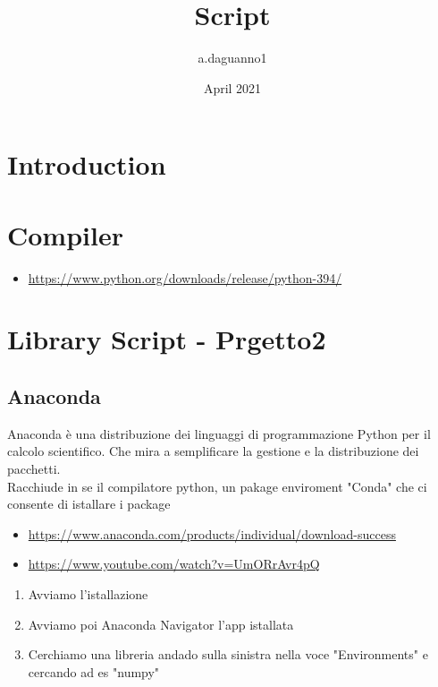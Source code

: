 \documentclass{article}
\title{Script}
\author{a.daguanno1 }
\date{April 2021}
\begin{document}
\maketitle

\section{Introduction}
\section{Compiler}
\begin{itemize}
    \item\url{https://www.python.org/downloads/release/python-394/}
\end{itemize}
\section{Library Script - \textbf{Prgetto2}}
\subsection{Anaconda}
Anaconda è una distribuzione dei linguaggi di programmazione Python per il calcolo scientifico. Che mira a semplificare la gestione e la distribuzione dei pacchetti.
\\Racchiude in se il compilatore python, un pakage enviroment "Conda" che ci consente di istallare i package 
\begin{itemize}
    \item\url{https://www.anaconda.com/products/individual/download-success}
    \item\url{https://www.youtube.com/watch?v=UmORrAvr4pQ}
\end{itemize}
\begin{enumerate}
    \item Avviamo l'istallazione
    \item Avviamo poi Anaconda Navigator l'app istallata
    \item Cerchiamo una libreria andado sulla sinistra nella voce "Environments" e cercando ad es "numpy"
\end{enumerate}
\end{document}
